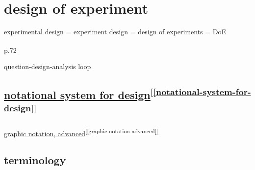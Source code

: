 \documentclass[
]{book}
\theoremstyle{definition}
\theoremstyle{definition}
\theoremstyle{definition}
\theoremstyle{definition}
\theoremstyle{remark}
\begin{document}
\chapter{design of experiment}\label{design-of-experiment}

experimental design = experiment design = design of experiments = DoE

\textsuperscript{} p.72

question-design-analysis loop

\section{\texorpdfstring{\hyperref[notational-system-for-design]{notational system for design}\textsuperscript{{[}\ref{notational-system-for-design}{]}}}{notational system for design{[}\ref{notational-system-for-design}{]}}}\label{notational-system-for-designrefnotational-system-for-design}

\hyperref[graphic-notation-advanced]{graphic notation, advanced}\textsuperscript{{[}\ref{graphic-notation-advanced}{]}}

\section{terminology}\label{terminology}
\end{document}
